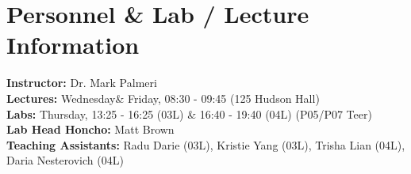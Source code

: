 \section{Personnel \& Lab / Lecture Information}
\textbf{Instructor:} Dr. Mark Palmeri \\
\textbf{Lectures:} Wednesday\& Friday, 08:30 - 09:45 (125 Hudson Hall)\\
\textbf{Labs:} Thursday, 13:25 - 16:25 (03L) \& 16:40 - 19:40 (04L) (P05/P07 Teer)\\
\textbf{Lab Head Honcho:} Matt Brown\\
\textbf{Teaching Assistants:} Radu Darie (03L), Kristie Yang (03L), Trisha Lian (04L), Daria Nesterovich (04L) \\
